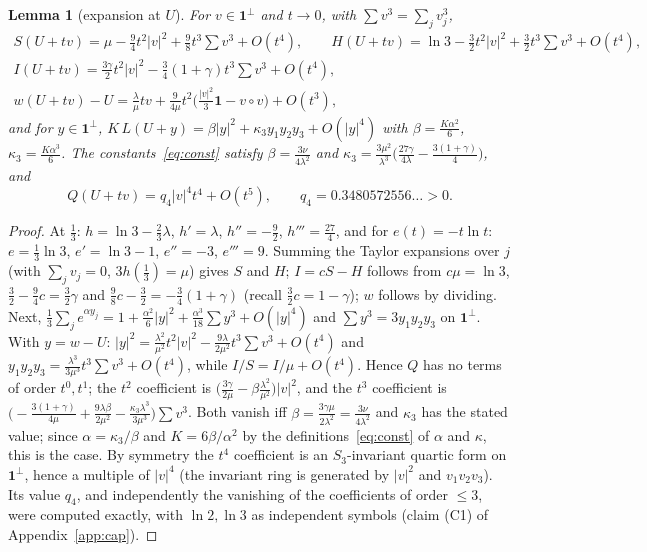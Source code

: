 \documentclass[11pt]{article}
\newtheorem{lemma}{Lemma}[section]
\theoremstyle{definition}
\numberwithin{equation}{section}
\newcommand{\one}{\mathbf 1}
\begin{document}
\begin{lemma}[expansion at $U$]\label{lem:taylor}
For $v\in\one^\perp$ and $t\to0$, with $\sum v^3=\sum_jv_j^3$,
\begin{gather*}
S(U+tv)=\mu-\tfrac94t^2|v|^2+\tfrac98t^3\textstyle\sum v^3+O(t^4),\qquad H(U+tv)=\ln3-\tfrac32t^2|v|^2+\tfrac32t^3\textstyle\sum v^3+O(t^4),\\
I(U+tv)=\tfrac{3\gamma}2t^2|v|^2-\tfrac34(1+\gamma)t^3\textstyle\sum v^3+O(t^4),\\
w(U+tv)-U=\tfrac\lambda\mu tv+\tfrac9{4\mu}t^2\bigl(\tfrac{|v|^2}3\one-v\circ v\bigr)+O(t^3),
\end{gather*}
and for $y\in\one^\perp$, $K\,L(U+y)=\beta|y|^2+\kappa_3y_1y_2y_3+O(|y|^4)$ with $\beta=\frac{K\alpha^2}6$, $\kappa_3=\frac{K\alpha^3}6$.
The constants~\eqref{eq:const} satisfy $\beta=\frac{3\nu}{4\lambda^2}$ and $\kappa_3=\frac{3\mu^2}{\lambda^3}\bigl(\frac{27\gamma}{4\lambda}-\frac{3(1+\gamma)}4\bigr)$,
and
\[
Q(U+tv)=q_4|v|^4t^4+O(t^5),\qquad q_4=0.3480572556\ldots>0 .
\]
\end{lemma}
\begin{proof}
At $\frac13$: $h=\ln3-\frac23\lambda$, $h'=\lambda$, $h''=-\frac92$, $h'''=\frac{27}4$, and for $e(t)=-t\ln t$: $e=\frac13\ln3$, $e'=\ln3-1$,
$e''=-3$, $e'''=9$. Summing the Taylor expansions over $j$ (with $\sum_jv_j=0$, $3h(\frac13)=\mu$) gives $S$ and $H$; $I=cS-H$ follows
from $c\mu=\ln3$, $\frac32-\frac94c=\frac32\gamma$ and $\frac98c-\frac32=-\frac34(1+\gamma)$ (recall $\frac32c=1-\gamma$); $w$ follows by
dividing. Next, $\frac13\sum_je^{\alpha y_j}=1+\frac{\alpha^2}6|y|^2+\frac{\alpha^3}{18}\sum y^3+O(|y|^4)$ and $\sum y^3=3y_1y_2y_3$ on
$\one^\perp$. With $y=w-U$: $|y|^2=\frac{\lambda^2}{\mu^2}t^2|v|^2-\frac{9\lambda}{2\mu^2}t^3\sum v^3+O(t^4)$ and
$y_1y_2y_3=\frac{\lambda^3}{3\mu^3}t^3\sum v^3+O(t^4)$, while $I/S=I/\mu+O(t^4)$. Hence $Q$ has no terms of order $t^0,t^1$; the $t^2$
coefficient is $\bigl(\frac{3\gamma}{2\mu}-\beta\frac{\lambda^2}{\mu^2}\bigr)|v|^2$, and the $t^3$ coefficient is
$\bigl(-\frac{3(1+\gamma)}{4\mu}+\frac{9\lambda\beta}{2\mu^2}-\frac{\kappa_3\lambda^3}{3\mu^3}\bigr)\sum v^3$. Both vanish iff
$\beta=\frac{3\gamma\mu}{2\lambda^2}=\frac{3\nu}{4\lambda^2}$ and $\kappa_3$ has the stated value; since $\alpha=\kappa_3/\beta$ and
$K=6\beta/\alpha^2$ by the definitions~\eqref{eq:const} of $\alpha$ and $\kappa$, this is the case. By symmetry the $t^4$ coefficient is an
$S_3$-invariant quartic form on $\one^\perp$, hence a multiple of $|v|^4$ (the invariant ring is generated by $|v|^2$ and
$v_1v_2v_3$). Its value $q_4$, and independently the vanishing of the coefficients of order $\le3$, were computed exactly, with
$\ln2,\ln3$ as independent symbols (claim (C1) of Appendix~\ref{app:cap}).
\end{proof}
\end{document}
